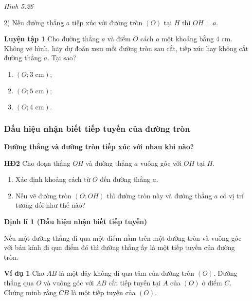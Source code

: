 \begin{lesson}
\begin{center}
    \textit{Hình 5.26}
    \end{center}

    2) Nếu đường thẳng $a$ tiếp xúc với đường tròn $(O)$ tại $H$ thì $OH\perp a$.

    \textbf{Luyện tập 1} Cho đường thẳng $a$ và điểm $O$ cách $a$ một khoảng bằng 4 cm. Không vẽ hình, hãy dự đoán xem mỗi đường tròn sau cắt, tiếp xúc hay không cắt đường thẳng $a$. Tại sao?
    \begin{enumerate}[label=\alph*)]
        \item $(O;3\text{ cm})$;
        \item $(O;5\text{ cm})$;
        \item $(O;4\text{ cm})$.
    \end{enumerate}

    \answerline
    \answerline

    \subsubsection{Dấu hiệu nhận biết tiếp tuyến của đường tròn}

    \textbf{Đường thẳng và đường tròn tiếp xúc với nhau khi nào?}

    \textbf{HĐ2} Cho đoạn thẳng $OH$ và đường thẳng $a$ vuông góc với $OH$ tại $H$.
    \begin{enumerate}[label=\alph*)]
        \item Xác định khoảng cách từ $O$ đến đường thẳng $a$.

        \answerline
        \item Nếu vẽ đường tròn $(O;OH)$ thì đường tròn này và đường thẳng $a$ có vị trí tương đối như thế nào?

        \answerline
    \end{enumerate}

    \begin{keyconcept}
        \textbf{Định lí 1 (Dấu hiệu nhận biết tiếp tuyến)}

        Nếu một đường thẳng đi qua một điểm nằm trên một đường tròn và vuông góc với bán kính đi qua điểm đó thì đường thẳng ấy là một tiếp tuyến của đường tròn.
    \end{keyconcept}

    \textbf{Ví dụ 1} Cho $AB$ là một dây không đi qua tâm của đường tròn $(O)$. Đường thẳng qua $O$ và vuông góc với $AB$ cắt tiếp tuyến tại $A$ của $(O)$ ở điểm $C$. Chứng minh rằng $CB$ là một tiếp tuyến của $(O)$.


\end{lesson}
